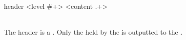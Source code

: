 \begin{identifier}{header}
<level #+> <content .+>
\end{identifier}
 \\

The header is a . Only the  held by the  is outputted to the .

\begin{examples}
\end{examples}

